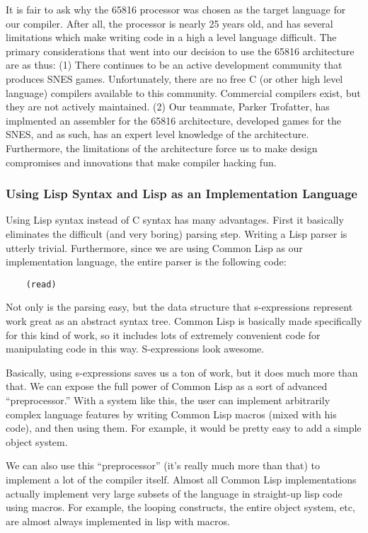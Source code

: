 \documentclass {article}
\begin{document}
It is fair to ask why the 65816 processor was chosen as the target
language for our compiler.  After all, the processor is nearly 25
years old, and has several limitations which make writing code in a
high a level language difficult.  The primary considerations that went
into our decision to use the 65816 architecture are as thus: (1) There
continues to be an active development community that produces SNES
games.  Unfortunately, there are no free C (or other high level
language) compilers available to this community.  Commercial compilers
exist, but they are not actively maintained.  (2) Our teammate, Parker
Trofatter, has implmented an assembler for the 65816 architecture,
developed games for the SNES, and as such, has an expert level
knowledge of the architecture. Furthermore, the limitations of the
architecture force us to make design compromises and innovations that
make compiler hacking fun.

\subsubsection{Using Lisp Syntax and Lisp as an Implementation Language}

Using Lisp syntax instead of C syntax has many advantages.  First it
basically eliminates the difficult (and very boring) parsing step.
Writing a Lisp parser is utterly trivial.  Furthermore, since we are
using Common Lisp as our implementation language, the entire parser is
the following code:

\begin{verbatim}
    (read)
\end{verbatim}

Not only is the parsing easy, but the data structure that
s-expressions represent work great as an abstract syntax tree.  Common
Lisp is basically made specifically for this kind of work, so it
includes lots of extremely convenient code for manipulating code in
this way.  S-expressions look awesome.

Basically, using s-expressions saves us a ton of work, but it does
much more than that.  We can expose the full power of Common Lisp as a
sort of advanced ``preprocessor.''  With a system like this, the user
can implement arbitrarily complex language features by writing Common
Lisp macros (mixed with his code), and then using them.  For example,
it would be pretty easy to add a simple object system.

We can also use this ``preprocessor'' (it's really much more than
that) to implement a lot of the compiler itself.  Almost all Common
Lisp implementations actually implement very large subsets of the
language in straight-up lisp code using macros.  For example, the
looping constructs, the entire object system, etc, are almost always
implemented in lisp with macros.
\end{document}
